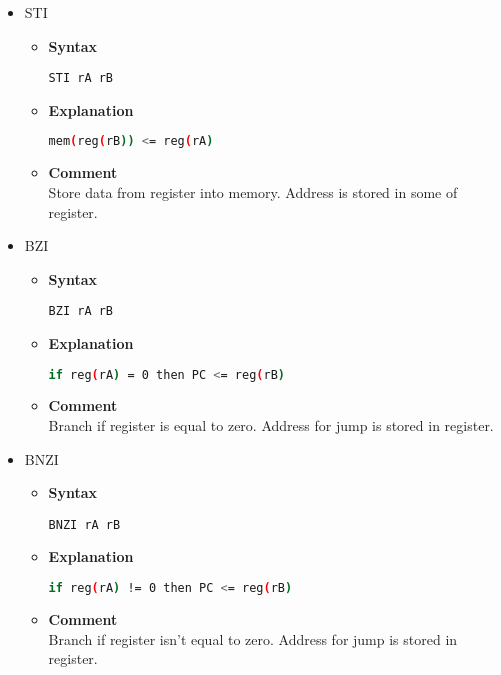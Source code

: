 \begin{itemize}
    \item STI
    \begin{itemize}
        \item \textbf{Syntax}
        \begin{lstlisting}[language={[x86masm]Assembler}, frame=single]
    STI rA rB
        \end{lstlisting}
        \item \textbf{Explanation}
        \begin{lstlisting}[language=bash, frame=single]
    mem(reg(rB)) <= reg(rA)
        \end{lstlisting}
        \item \textbf{Comment} \\
    Store data from register into memory. Address is stored in some of register.
    \end{itemize}

    \item BZI
    \begin{itemize}
        \item \textbf{Syntax}
        \begin{lstlisting}[language={[x86masm]Assembler}, frame=single]
    BZI rA rB
        \end{lstlisting}
        \item \textbf{Explanation}
        \begin{lstlisting}[language=bash, frame=single]
    if reg(rA) = 0 then PC <= reg(rB)
        \end{lstlisting}
        \item \textbf{Comment} \\
    Branch if register is equal to zero. Address for jump is stored in register.
    \end{itemize}

    \item BNZI
    \begin{itemize}
        \item \textbf{Syntax}
        \begin{lstlisting}[language={[x86masm]Assembler}, frame=single]
    BNZI rA rB
        \end{lstlisting}
        \item \textbf{Explanation}
        \begin{lstlisting}[language=bash, frame=single]
    if reg(rA) != 0 then PC <= reg(rB)
        \end{lstlisting}
        \item \textbf{Comment} \\
    Branch if register isn't equal to zero. Address for jump is stored in register.
    \end{itemize}


\end{itemize}
